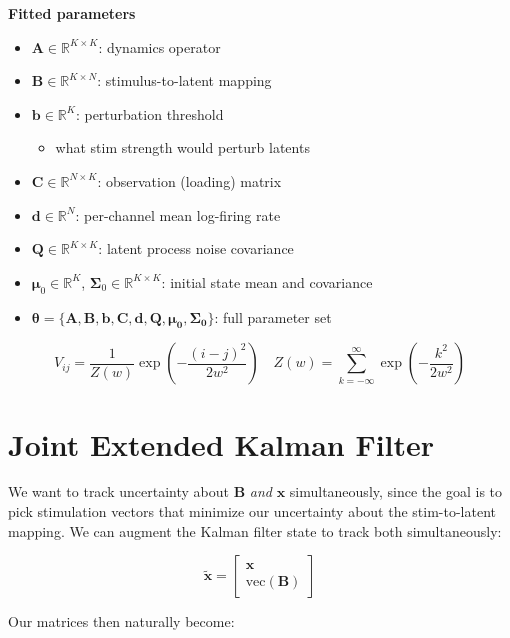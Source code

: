 \documentclass[11pt,letterpaper]{article} %
\begin{document}
\begin{minipage}[t]{0.47\textwidth}
\textbf{Fitted parameters}
\begin{itemize}[leftmargin=*, itemsep=0.3em]
    \item $\bm{A} \in \mathbb{R}^{K \times K}$: dynamics operator
    \item $\bm{B} \in \mathbb{R}^{K \times N}$: stimulus-to-latent mapping
    \item $\bm{b} \in \mathbb{R}^{K}$: perturbation threshold
        \begin{itemize}[itemsep=0em, topsep=0em]
            \item[$-$] what stim strength would perturb latents
        \end{itemize}
    \item $\bm{C} \in \mathbb{R}^{N \times K}$: observation (loading) matrix
    \item $\bm{d} \in \mathbb{R}^{N}$: per-channel mean log-firing rate
    \item $\bm{Q} \in \mathbb{R}^{K \times K}$: latent process noise covariance
    \item $\bm{\mu}_0 \in \mathbb{R}^K$, $\boldsymbol{\Sigma}_0 \in \mathbb{R}^{K \times K}$: initial state mean and covariance
    \item $\bm{\theta} = \{\bm{A, B, b, C, d, Q, \mu_0, \Sigma_0}\}$: full parameter set
\end{itemize}
\end{minipage}
\[
    V_{ij} = \frac{1}{Z(w)}\exp\!\left(-\frac{(i-j)^2}{2w^2}\right) \quad
    Z(w) = \sum_{k=-\infty}^{\infty}\exp\!\left(-\frac{k^2}{2w^2}\right)
\]


\section*{Joint Extended Kalman Filter}
We want to track uncertainty about $\bm{B}$ \textit{and} $\bm{x}$ simultaneously, since the goal is to pick stimulation vectors that minimize our uncertainty about the stim-to-latent mapping. We can augment the Kalman filter state to track both simultaneously:

\[
\widetilde{\bm{x}} = \begin{bmatrix}
\bm{x}\\
\textrm{vec}(\bm{B})
\end{bmatrix}
\]

Our matrices then naturally become:
\end{document}
